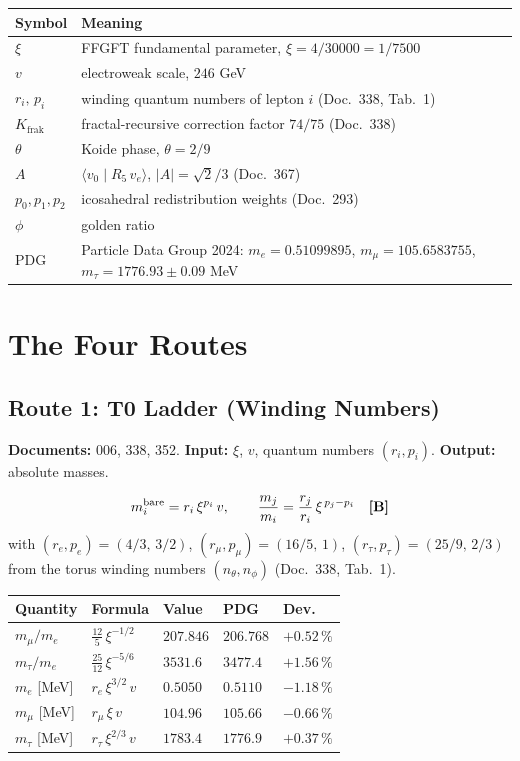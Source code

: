 \medskip
\begin{tabular}{@{}lp{11cm}@{}}
\toprule
\textbf{Symbol} & \textbf{Meaning} \\
\midrule
$\xi$ & FFGFT fundamental parameter, $\xi = 4/30000 = 1/7500$ \\
$v$ & electroweak scale, $246$ GeV \\
$r_i,\,p_i$ & winding quantum numbers of lepton $i$ (Doc.~338, Tab.~1) \\
$K_\text{frak}$ & fractal-recursive correction factor $74/75$ (Doc.~338) \\
$\theta$ & Koide phase, $\theta = 2/9$ \\
$A$ & $\langle v_0\mid R_5\,v_e\rangle$, $|A| = \sqrt2/3$ (Doc.~367) \\
$p_0,p_1,p_2$ & icosahedral redistribution weights (Doc.~293) \\
$\phi$ & golden ratio \\
PDG & Particle Data Group 2024: $m_e = 0{.}51099895$, $m_\mu = 105{.}6583755$, $m_\tau = 1776{.}93\pm0{.}09$ MeV \\
\bottomrule
\end{tabular}

\section{The Four Routes}

\subsection{Route 1: T0 Ladder (Winding Numbers)}

\textbf{Documents:} 006, 338, 352. \quad
\textbf{Input:} $\xi$, $v$, quantum numbers $(r_i, p_i)$. \quad
\textbf{Output:} absolute masses.

\[
  m_i^\text{bare} = r_i\,\xi^{p_i}\,v, \qquad
  \frac{m_j}{m_i} = \frac{r_j}{r_i}\,\xi^{\,p_j - p_i} \quad \textbf{[B]}
\]
with $(r_e,p_e) = (4/3,\,3/2)$, $(r_\mu,p_\mu) = (16/5,\,1)$, $(r_\tau,p_\tau) = (25/9,\,2/3)$
from the torus winding numbers $(n_\theta, n_\phi)$ (Doc.~338, Tab.~1).

\begin{center}
\begin{tabular}{@{}lllll@{}}
\toprule
Quantity & Formula & Value & PDG & Dev. \\
\midrule
$m_\mu/m_e$  & $\tfrac{12}{5}\,\xi^{-1/2}$  & $207{.}846$ & $206{.}768$ & $+0{.}52\,\%$ \\
$m_\tau/m_e$ & $\tfrac{25}{12}\,\xi^{-5/6}$ & $3531{.}6$  & $3477{.}4$  & $+1{.}56\,\%$ \\
$m_e$ [MeV]  & $r_e\,\xi^{3/2}\,v$ & $0{.}5050$ & $0{.}5110$ & $-1{.}18\,\%$ \\
$m_\mu$ [MeV]& $r_\mu\,\xi\,v$     & $104{.}96$ & $105{.}66$ & $-0{.}66\,\%$ \\
$m_\tau$ [MeV]& $r_\tau\,\xi^{2/3}\,v$ & $1783{.}4$ & $1776{.}9$ & $+0{.}37\,\%$ \\
\bottomrule
\end{tabular}
\end{center}

